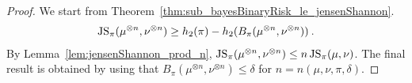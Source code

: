 \begin{proof}%
{}
We start from Theorem~\ref{thm:sub_bayesBinaryRisk_le_jensenShannon}.
\begin{align*}
\operatorname{JS}_\pi(\mu^{\otimes n}, \nu^{\otimes n}) \ge h_2(\pi) - h_2(B_\pi(\mu^{\otimes n}, \nu^{\otimes n})) \: .
\end{align*}
By Lemma~\ref{lem:jensenShannon_prod_n}, $\operatorname{JS}_\pi(\mu^{\otimes n}, \nu^{\otimes n}) \le n \operatorname{JS}_\pi(\mu, \nu)$. The final result is obtained by using that $B_\pi(\mu^{\otimes n}, \nu^{\otimes n}) \le \delta$ for $n = n(\mu, \nu, \pi, \delta)$.
\end{proof}